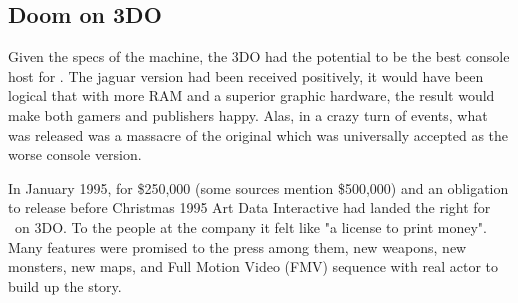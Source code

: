 \subsection{Doom on 3DO}
Given the specs of the machine, the 3DO had the potential to be the best console host for \doom. The jaguar version had been received positively, it would have been logical that with more RAM and a superior graphic hardware, the result would make both gamers and publishers happy. Alas, in a crazy turn of events, what was released was a massacre of the original which was universally accepted as the worse console version.\\  
\par
In January 1995, for \$250,000 (some sources mention \$500,000) and an obligation to release before Christmas 1995 Art Data Interactive had landed the right for \doom~on 3DO. To the people at the company it felt like "a license to print money". Many features were promised to the press among them, new weapons, new monsters, new maps, and Full Motion Video (FMV) sequence with real actor to build up the story.\\
\par
{}
\par


